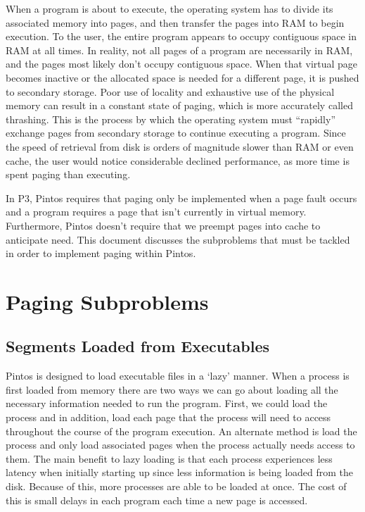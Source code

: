 \documentclass[11pt, letterpaper]{article}
\begin{document}
When a program is about to execute, the operating system has to divide its associated memory into pages, and then transfer the pages into RAM to begin execution. To the user, the entire program appears to occupy contiguous space in RAM at all times. In reality, not all pages of a program are necessarily in RAM, and the pages most likely don’t occupy contiguous space. When that virtual page becomes inactive or the allocated space is needed for a different page, it is pushed to secondary storage. Poor use of locality and exhaustive use of the physical memory can result in a constant state of paging, which is more accurately called thrashing. This is the process by which the operating system must “rapidly” exchange pages from secondary storage to continue executing a program. Since the speed of retrieval from disk is orders of magnitude slower than RAM or even cache, the user would notice considerable declined performance, as more time is spent paging than executing. 

In P3, Pintos requires that paging only be implemented when a page fault occurs and a program requires a page that isn’t currently in virtual memory. Furthermore, Pintos doesn’t require that we preempt pages into cache to anticipate need. This document discusses the subproblems that must be tackled in order to implement paging within Pintos.

\section{Paging Subproblems}

\subsection{Segments Loaded from Executables}
Pintos is designed to load executable files in a ‘lazy’ manner. When a process is first loaded from memory there are two ways we can go about loading all the necessary information needed to run the program. First, we could load the process and in addition, load each page that the process will need to access throughout the course of the program execution. An alternate method is load the process and only load associated pages when the process actually needs access to them. The main benefit to lazy loading is that each process experiences less latency when initially starting up since less information is being loaded from the disk. Because of this, more processes are able to be loaded at once. The cost of this is small delays in each program each time a new page is accessed. 
\end{document}
